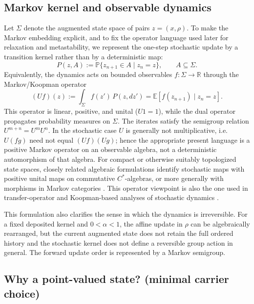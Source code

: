\documentclass[reprint,amsmath,amssymb,aps,prd,nofootinbib,floatfix]{revtex4-2}
\begin{document}
\subsection{Markov kernel and observable dynamics}

Let $\Sigma$ denote the augmented state space of pairs $z=(x,\rho)$.
To make the Markov embedding explicit, and to fix the operator language used later for relaxation and metastability, we represent the one-step stochastic update by a transition kernel rather than by a deterministic map:
\begin{equation}
P(z,A)
:=
\mathbb{P}\{z_{n+1}\in A\mid z_n=z\},
\qquad
A\subseteq\Sigma .
\end{equation}
Equivalently, the dynamics acts on bounded observables $f:\Sigma\to\mathbb{R}$ through the Markov/Koopman operator
\begin{equation}\label{eq:observable_operator}
(Uf)(z)
:=
\int_\Sigma f(z')\,P(z,dz')
=
\mathbb{E}[f(z_{n+1})\mid z_n=z].
\end{equation}
This operator is linear, positive, and unital ($U1=1$), while the dual operator propagates probability measures on $\Sigma$.
The iterates satisfy the semigroup relation $U^{m+n}=U^mU^n$.
In the stochastic case $U$ is generally not multiplicative, i.e. $U(fg)$ need not equal $(Uf)(Ug)$; hence the appropriate present language is a positive Markov operator on an observable algebra, not a deterministic automorphism of that algebra.
For compact or otherwise suitably topologized state spaces, closely related algebraic formulations identify stochastic maps with positive unital maps on commutative $C^*$-algebras, or more generally with morphisms in Markov categories \cite{Parzygnat2017,Fritz2020}.
This operator viewpoint is also the one used in transfer-operator and Koopman-based analyses of stochastic dynamics \cite{WilliamsKevrekidisRowley2015,KlusEtAl2018}.

This formulation also clarifies the sense in which the dynamics is irreversible.
For a fixed deposited kernel and $0<\alpha<1$, the affine update in $\rho$ can be algebraically rearranged, but the current augmented state does not retain the full ordered history and the stochastic kernel does not define a reversible group action in general.
The forward update order is represented by a Markov semigroup.

\subsection{Why a point-valued state? (minimal carrier choice)}
\end{document}
